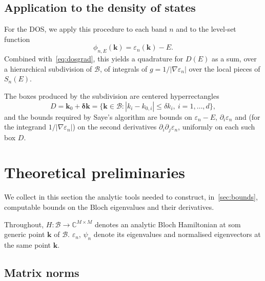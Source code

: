 \documentclass[11pt]{article}
\numberwithin{equation}{section}
\begin{document}
\subsection{Application to the density of states}

For the DOS, we apply this procedure to each band \(n\) and to the level-set function
\begin{equation}
    \phi_{n, E}(\mathbf{k}) = \varepsilon_n(\mathbf{k}) - E.
\end{equation}
Combined with~\eqref{eq:dosgrad}, this yields a quadrature for \(D(E)\) as a sum, over a
hierarchical subdivision of \(\mathcal{B}\), of integrals of \(g = 1 / |\nabla
\varepsilon_n|\) over the local pieces of \(S_n(E)\).

The boxes produced by the subdivision are centered hyperrectangles
\begin{equation}
    D = \mathbf{k}_0 + \bm{\delta\mathbf{k}} =
    \{\mathbf{k} \in \mathcal{B} : |k_i - k_{0,i}| \leq \delta k_i,\
    i = 1, \dots, d\},
\end{equation}
and the bounds required by Saye's algorithm are bounds on \(\varepsilon_n - E\),
\(\partial_i \varepsilon_n\) and (for the integrand \(1/|\nabla \varepsilon_n|\)) on the
second derivatives \(\partial_i \partial_j \varepsilon_n\), uniformly on each such box
\(D\).

\section{Theoretical preliminaries}\label{sec:preliminaries}

We collect in this section the analytic tools needed to construct,
in~\autoref{sec:bounds}, computable bounds on the Bloch eigenvalues and their derivatives.

Throughout, \(H : \mathcal{B} \to \mathbb{C}^{M\times M}\) denotes an analytic Bloch
Hamiltonian at som generic point \(\mathbf{k}\) of \(\mathcal{B}\).  \(\varepsilon_n\), \(\psi_n\)
denote its eigenvalues and normalised eigenvectors at the same point \(\mathbf{k}\).

\subsection{Matrix norms}\label{sec:matrix-norms}
\end{document}
